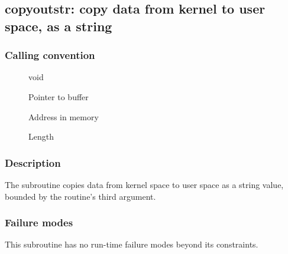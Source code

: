 \clearpage
{}
{}
\label{subr:copyoutstr}
\subsection*{copyoutstr: copy data from kernel to user space, as a string}

\subsubsection*{Calling convention}

\begin{description}
\item[] void
\item[] Pointer to buffer
\item[] Address in memory
\item[] Length
\end{description}

\subsubsection*{Description}

The  subroutine copies data from kernel space
to user space as a string value, bounded by the routine's third argument.

\subsubsection*{Failure modes}

This subroutine has no run-time failure modes beyond its constraints.
